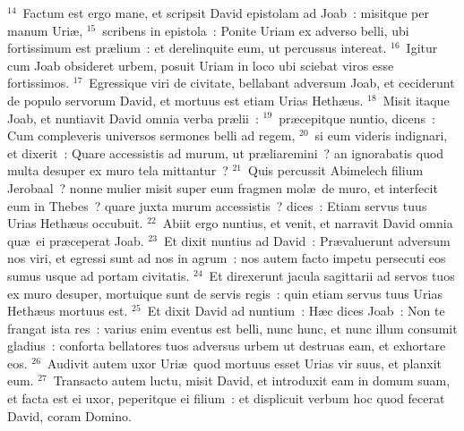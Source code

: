 ${}^{14}$~Factum est ergo mane, et scripsit David epistolam ad Joab~: misitque per manum Uri\ae ,
${}^{15}$~scribens in epistola~: Ponite Uriam ex adverso belli, ubi fortissimum est pr\ae lium~: et derelinquite eum, ut percussus intereat.
${}^{16}$~Igitur cum Joab obsideret urbem, posuit Uriam in loco ubi sciebat viros esse fortissimos.
${}^{17}$~Egressique viri de civitate, bellabant adversum Joab, et ceciderunt de populo servorum David, et mortuus est etiam Urias Heth\ae us.
${}^{18}$~Misit itaque Joab, et nuntiavit David omnia verba pr\ae lii~:
${}^{19}$~pr\ae cepitque nuntio, dicens~: Cum compleveris universos sermones belli ad regem,
${}^{20}$~si eum videris indignari, et dixerit~: Quare accessistis ad murum, ut pr\ae liaremini~? an ignorabatis quod multa desuper ex muro tela mittantur~?
${}^{21}$~Quis percussit Abimelech filium Jerobaal~? nonne mulier misit super eum fragmen mol\ae\ de muro, et interfecit eum in Thebes~? quare juxta murum accessistis~? dices~: Etiam servus tuus Urias Heth\ae us occubuit.
${}^{22}$~Abiit ergo nuntius, et venit, et narravit David omnia qu\ae\ ei pr\ae ceperat Joab.
${}^{23}$~Et dixit nuntius ad David~: Pr\ae valuerunt adversum nos viri, et egressi sunt ad nos in agrum~: nos autem facto impetu persecuti eos sumus usque ad portam civitatis.
${}^{24}$~Et direxerunt jacula sagittarii ad servos tuos ex muro desuper, mortuique sunt de servis regis~: quin etiam servus tuus Urias Heth\ae us mortuus est.
${}^{25}$~Et dixit David ad nuntium~: H\ae c dices Joab~: Non te frangat ista res~: varius enim eventus est belli, nunc hunc, et nunc illum consumit gladius~: conforta bellatores tuos adversus urbem ut destruas eam, et exhortare eos.
${}^{26}$~Audivit autem uxor Uri\ae\ quod mortuus esset Urias vir suus, et planxit eum.
${}^{27}$~Transacto autem luctu, misit David, et introduxit eam in domum suam, et facta est ei uxor, peperitque ei filium~: et displicuit verbum hoc quod fecerat David, coram Domino.


